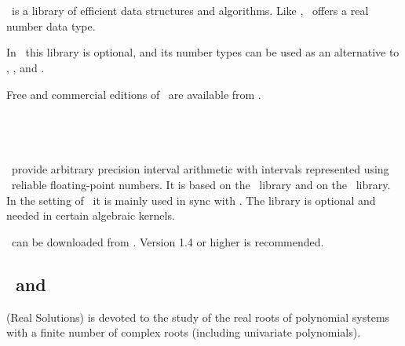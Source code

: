 
%
%
%

\subsection{\leda\ \label{thirdparty:Leda}}

\leda\ is a library of efficient data structures and
algorithms. Like \core, \leda\ offers a real number data type.  

In \cgal\ this library is optional, and its number types can 
be used as an alternative to \gmp, \mpfr, and \core.

Free and commercial editions of \leda\ are available from \ledapage.

\subsection{\mpfi\ \label{thirdparty:MPFI}}

\mpfi\ provide arbitrary precision interval arithmetic with intervals 
represented using \mpfr\ reliable floating-point numbers. 
It is based on the \gmp\ library and on the \mpfr\ library.
In the setting of \cgal\ it is mainly used in sync with \rs. 
The library is optional and needed in certain algebraic
kernels.

\mpfi\ can be downloaded from \mpfipage. Version 1.4 or higher is recommended.

\subsection{\rs\ and \label{thirdparty:RS}\label{thirdparty:RS3}}

\rs{} (Real Solutions) is devoted to the study of the real
roots of polynomial systems with a finite number of complex roots
(including univariate polynomials). 


